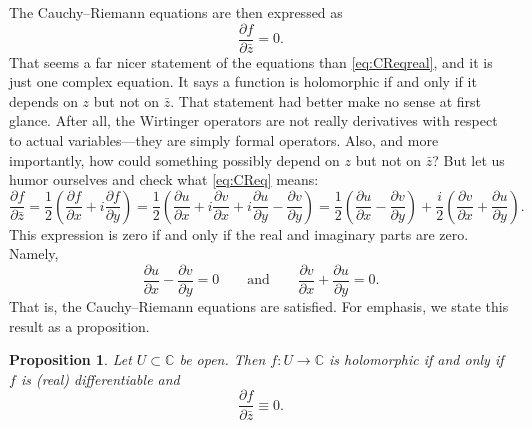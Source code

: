 \documentclass[12pt,openany]{book}
\newcommand{\C}{{\mathbb{C}}}
\theoremstyle{plain}
\newtheorem{prop}[thm]{Proposition}
\theoremstyle{remark}
\theoremstyle{definition}
\theoremstyle{exercise}
\theoremstyle{example}
\begin{document}
The Cauchy--Riemann equations are then expressed as
\begin{equation} \label{eq:CReq}
\frac{\partial f}{\partial \bar{z}} = 0 .
\end{equation}
That seems a far nicer statement of the equations than \eqref{eq:CReqreal},
and it is just one complex equation.  
It says
a function is holomorphic if and only if it depends on $z$ but not on
$\bar{z}$.  That statement had better make no sense at first glance.
After all, the Wirtinger operators are not really derivatives with
respect to actual variables---they are simply formal operators.
Also, and more importantly,
how could something possibly depend on $z$ but not on $\bar{z}$?
But let us humor ourselves and check what \eqref{eq:CReq} means:
\begin{equation*}
\frac{\partial f}{\partial \bar{z}} 
=
\frac{1}{2}
\left(
\frac{\partial f}{\partial x} + i
\frac{\partial f}{\partial y}
\right)
=
\frac{1}{2}
\left(
\frac{\partial u}{\partial x} 
+ i \frac{\partial v}{\partial x} 
+ i \frac{\partial u}{\partial y}
- \frac{\partial v}{\partial y}
\right) 
=
\frac{1}{2}
\left(
\frac{\partial u}{\partial x} 
- \frac{\partial v}{\partial y}
\right)
+
\frac{i}{2}
\left(
\frac{\partial v}{\partial x} 
+ \frac{\partial u}{\partial y}
\right) .
\end{equation*}
This expression is zero if and only if the real and imaginary
parts are zero.  Namely,
\begin{equation*}
\frac{\partial u}{\partial x} 
- \frac{\partial v}{\partial y}
= 0
\qquad
\text{and}
\qquad
\frac{\partial v}{\partial x} 
+ \frac{\partial u}{\partial y} = 0
.
\end{equation*}
That is, the Cauchy--Riemann equations are satisfied.  For emphasis,
we state this result as a proposition.

\begin{prop}
\label{prop:WirtCR}
Let $U \subset \C$ be open.  Then $f \colon U \to \C$ is
holomorphic if and only if
$f$ is (real) differentiable and
\begin{equation*}
\frac{\partial f}{\partial \bar{z}} \equiv 0 .
\end{equation*}
\end{prop}
\end{document}
